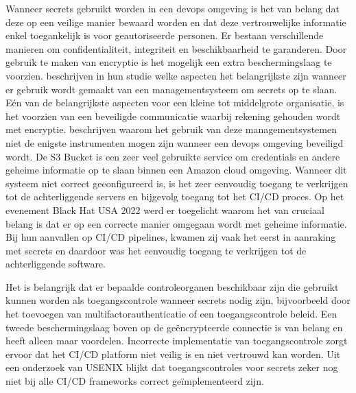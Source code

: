 Wanneer secrets gebruikt worden in een devops omgeving is het van belang dat deze op een veilige manier bewaard worden en dat deze vertrouwelijke informatie enkel toegankelijk is voor geautoriseerde personen. Er bestaan verschillende manieren om confidentialiteit, integriteit en beschikbaarheid te garanderen. Door gebruik te maken van encryptie is het mogelijk een extra beschermingslaag te voorzien. \textcite{Kuzminykh2020} beschrijven in hun studie welke aspecten het belangrijkste zijn wanneer er gebruik wordt gemaakt van een managementsysteem om secrets op te slaan.  Eén van de belangrijkste aspecten voor een kleine tot middelgrote organisatie, is het voorzien van een beveiligde communicatie waarbij rekening gehouden wordt met encryptie. \autocite{AaronHaymore} beschrijven waarom het gebruik van deze managementsystemen niet de enigste instrumenten mogen zijn wanneer een devops omgeving beveiligd wordt. De S3 Bucket is een zeer veel gebruikte service om credentials en andere geheime informatie op te slaan binnen een Amazon cloud omgeving. Wanneer dit systeem niet correct geconfigureerd is, is het zeer eenvoudig toegang te verkrijgen tot de achterliggende servers en bijgevolg toegang tot het CI/CD proces. Op het evenement Black Hat USA 2022 \autocite{Gazdag} werd er toegelicht waarom het van cruciaal belang is dat er op een correcte manier omgegaan wordt met geheime informatie. Bij hun aanvallen op CI/CD pipelines, kwamen zij vaak het eerst in aanraking met secrets en daardoor was het eenvoudig toegang te verkrijgen tot de achterliggende software. 

Het is belangrijk dat er bepaalde controleorganen beschikbaar zijn die gebruikt kunnen worden als toegangscontrole wanneer secrets nodig zijn, bijvoorbeeld door het toevoegen van multifactorauthenticatie of een toegangscontrole beleid. Een tweede beschermingslaag boven op de geëncrypteerde connectie is van belang en heeft alleen maar voordelen. Incorrecte implementatie van toegangscontrole zorgt ervoor dat het CI/CD platform niet veilig is en niet vertrouwd kan worden. Uit een onderzoek van USENIX \autocite{Koishybayev2022} blijkt dat toegangscontroles voor secrets zeker nog niet bij alle CI/CD frameworks correct geïmplementeerd zijn.




